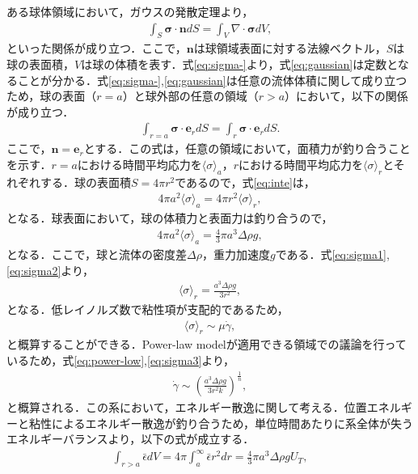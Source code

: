 ある球体領域において，ガウスの発散定理より，
\begin{eqnarray}
    \int_S{\bm{\sigma \cdot \bm{n}}}dS = \int_V{\nabla \cdot \bm{\sigma}}dV ,
    \label{eq:gaussian}
\end{eqnarray}
といった関係が成り立つ．ここで，$\bm{n}$は球領域表面に対する法線ベクトル，$S$は球の表面積，$V$は球の体積を表す．式\ref{eq:sigma-}より，式\ref{eq:gaussian}は定数となることが分かる．式\ref{eq:sigma-},\ref{eq:gaussian}は任意の流体体積に関して成り立つため，球の表面（$r = a$）と球外部の任意の領域（$r > a$）において，以下の関係が成り立つ．
\begin{eqnarray}
    \int_{r=a}\bm{\sigma}\cdot\bm{e}_r dS=\int_r\bm{\sigma}\cdot\bm{e}_r dS .
    \label{eq:inte}
\end{eqnarray}
ここで，$\bm{n} = \bm{e}_r$とする．この式は，任意の領域において，面積力が釣り合うことを示す．$r = a$における時間平均応力を$\langle\sigma\rangle_a$，$r$における時間平均応力を$\langle\sigma\rangle_r$とそれぞれする．球の表面積$S=4\pi r^2$であるので，式\ref{eq:inte}は，
\begin{eqnarray}
    4\pi a^2\langle\sigma\rangle_a = 4\pi r^2\langle\sigma\rangle_r ,
    \label{eq:sigma1}
\end{eqnarray}
となる．球表面において，球の体積力と表面力は釣り合うので，
\begin{eqnarray}
    4\pi a^2\langle\sigma\rangle_a = \frac{4}{3} \pi a^3 \Delta \rho g ,
    \label{eq:sigma2}
\end{eqnarray}
となる．ここで，球と流体の密度差$\Delta \rho$，重力加速度$g$である．式\ref{eq:sigma1},\ref{eq:sigma2}より，
\begin{eqnarray}
    \langle\sigma\rangle_r = \frac{a^3\Delta\rho g}{3r^2} ,
\end{eqnarray}
となる．低レイノルズ数で粘性項が支配的であるため，
\begin{eqnarray}
    \langle\sigma\rangle_r \sim \mu \dot{\gamma} ,
    \label{eq:sigma3}
\end{eqnarray}
と概算することができる．Power-law modelが適用できる領域での議論を行っているため，式\ref{eq:power-low},\ref{eq:sigma3}より，
\begin{eqnarray}
    \dot{\gamma} \sim \left(\frac{a^3\Delta\rho g}{3r^2 k}\right)^{\frac{1}{n}} ,
    \label{eq:gamma_abs}
\end{eqnarray}
と概算される．この系において，エネルギー散逸に関して考える．位置エネルギーと粘性によるエネルギー散逸が釣り合うため，単位時間あたりに系全体が失うエネルギーバランスより，以下の式が成立する．
\begin{eqnarray}
    \int_{r>a}\bar{\epsilon}dV = 4 \pi \int^\infty_a \bar{\epsilon}r^2 dr = \frac{4}{3}\pi a^3\Delta\rho g U_T ,
    \label{eq:eg}
\end{eqnarray}

